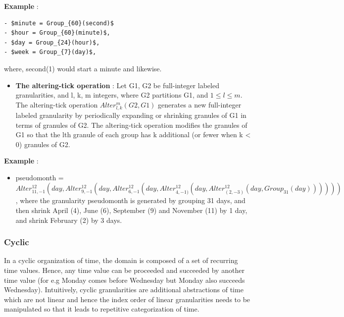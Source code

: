 \documentclass[12pt]{article}
\providecommand{\tightlist}{%
  \setlength{\itemsep}{0pt}\setlength{\parskip}{0pt}}
\begin{document}
\textbf{Example} :

\begin{verbatim}
- $minute = Group_{60}(second)$
- $hour = Group_{60}(minute)$,
- $day = Group_{24}(hour)$,
- $week = Group_{7}(day)$,
\end{verbatim}

where, second(1) would start a minute and likewise.

\begin{itemize}
\tightlist
\item
  \textbf{The altering-tick operation} : Let G1, G2 be full-integer
  labeled granularities, and l, k, m integers, where G2 partitions G1,
  and \(1 \leq l \leq m\). The altering-tick operation
  \(Alter^{m}_{l,k} (G2, G1)\) generates a new full-integer labeled
  granularity by periodically expanding or shrinking granules of G1 in
  terms of granules of G2. The altering-tick operation modifies the
  granules of G1 so that the lth granule of each group has
  \textbar{}k\textbar{} additional (or fewer when k \textless{} 0)
  granules of G2.
\end{itemize}

\textbf{Example} :

\begin{itemize}
\tightlist
\item
  pseudomonth =
  \(Alter^{12}_{11,-1}(day, Alter^{12}_{9,-1}(day, Alter^{12}_{6,-1}(day, Alter^{12}_{4,-1)}(day, Alter^{12}_{(2,-3)}(day, Group_{31}(day))))))\),
  where the granularity pseudomonth is generated by grouping 31 days,
  and then shrink April (4), June (6), September (9) and November (11)
  by 1 day, and shrink February (2) by 3 days. \citep{Ning2002-tf}
\end{itemize}

\hypertarget{sec:cyclic-gran-def}{%
\subsubsection{Cyclic}\label{sec:cyclic-gran-def}}

In a cyclic organization of time, the domain is composed of a set of
recurring time values. Hence, any time value can be proceeded and
succeeded by another time value (for e.g Monday comes before Wednesday
but Monday also succeeds Wednesday). Intuitively, cyclic granularities
are additional abstractions of time which are not linear and hence the
index order of linear granularities needs to be manipulated so that it
leads to repetitive categorization of time.
\end{document}
